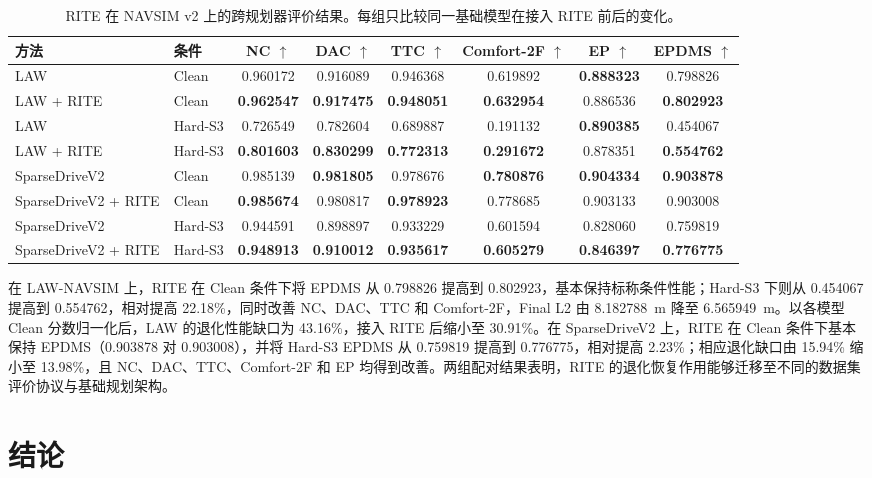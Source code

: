 \documentclass[letterpaper,10pt,conference]{ieeeconf}
\begin{document}
\begin{table}[t]
\caption{RITE 在 NAVSIM v2 上的跨规划器评价结果。每组只比较同一基础模型在接入 RITE 前后的变化。}
\label{tab:navsim_crossplanner}
\centering
\small
\setlength{\tabcolsep}{5.5pt}
\begin{tabular}{llcccccc}
\toprule
方法 & 条件 & NC $\uparrow$ & DAC $\uparrow$ & TTC $\uparrow$ & Comfort-2F $\uparrow$ & EP $\uparrow$ & EPDMS $\uparrow$ \\
\midrule
LAW & Clean & 0.960172 & 0.916089 & 0.946368 & 0.619892 & \textbf{0.888323} & 0.798826 \\
LAW + RITE & Clean & \textbf{0.962547} & \textbf{0.917475} & \textbf{0.948051} & \textbf{0.632954} & 0.886536 & \textbf{0.802923} \\
LAW & Hard-S3 & 0.726549 & 0.782604 & 0.689887 & 0.191132 & \textbf{0.890385} & 0.454067 \\
LAW + RITE & Hard-S3 & \textbf{0.801603} & \textbf{0.830299} & \textbf{0.772313} & \textbf{0.291672} & 0.878351 & \textbf{0.554762} \\
\midrule
SparseDriveV2 & Clean & 0.985139 & \textbf{0.981805} & 0.978676 & \textbf{0.780876} & \textbf{0.904334} & \textbf{0.903878} \\
SparseDriveV2 + RITE & Clean & \textbf{0.985674} & 0.980817 & \textbf{0.978923} & 0.778685 & 0.903133 & 0.903008 \\
SparseDriveV2 & Hard-S3 & 0.944591 & 0.898897 & 0.933229 & 0.601594 & 0.828060 & 0.759819 \\
SparseDriveV2 + RITE & Hard-S3 & \textbf{0.948913} & \textbf{0.910012} & \textbf{0.935617} & \textbf{0.605279} & \textbf{0.846397} & \textbf{0.776775} \\
\bottomrule
\end{tabular}
\end{table}

在 LAW-NAVSIM 上，RITE 在 Clean 条件下将 EPDMS 从 0.798826 提高到 0.802923，基本保持标称条件性能；Hard-S3 下则从 0.454067 提高到 0.554762，相对提高 22.18\%，同时改善 NC、DAC、TTC 和 Comfort-2F，Final L2 由 8.182788~m 降至 6.565949~m。以各模型 Clean 分数归一化后，LAW 的退化性能缺口为 43.16\%，接入 RITE 后缩小至 30.91\%。在 SparseDriveV2 上，RITE 在 Clean 条件下基本保持 EPDMS（0.903878 对 0.903008），并将 Hard-S3 EPDMS 从 0.759819 提高到 0.776775，相对提高 2.23\%；相应退化缺口由 15.94\% 缩小至 13.98\%，且 NC、DAC、TTC、Comfort-2F 和 EP 均得到改善。两组配对结果表明，RITE 的退化恢复作用能够迁移至不同的数据集评价协议与基础规划架构。

\section{结论}
\end{document}
